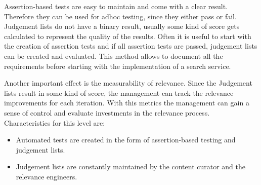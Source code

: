 Assertion-based tests are easy to maintain and come with a clear result.
Therefore they can be used for adhoc testing, since they either pass or fail.
Judgement lists do not have a binary result, usually some kind of score gets calculated to represent the quality of the results. 
Often it is useful to start with the creation of assertion tests and if all assertion tests are passed, judgement lists can be created and evaluated.
This method allows to document all the requirements before starting with the implementation of a search service.
\par
Another important effect is the measurability of relevance. 
Since the Judgement lists result in some kind of score,
the management can track the relevance improvements for each iteration.
With this metrics the management can gain a sense of control and evaluate investments in the relevance process.\\
Characteristics for this level are:
\begin{itemize}
	\item Automated tests are created in the form of assertion-based testing and judgement lists.
	\item Judgement lists are constantly maintained by the content curator and the relevance engineers.
\end{itemize}

